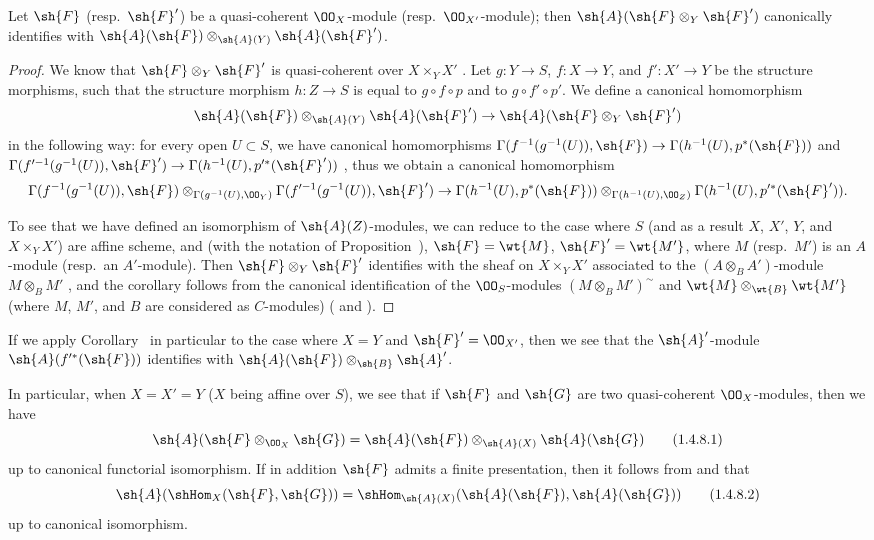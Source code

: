 \begin{cor}[1.4.7]
\label{2.1.4.7}
Let $\sh{F}$ (resp.~$\sh{F}'$) be a quasi-coherent $\OO_X$-module (resp.~$\OO_{X'}$-module); then $\sh{A}(\sh{F}\otimes_Y\sh{F}')$ canonically identifies with $\sh{A}(\sh{F})\otimes_{\sh{A}(Y)}\sh{A}(\sh{F}')$.
\end{cor}

\begin{proof}
\label{proof-2.1.4.7}
We know that $\sh{F}\otimes_Y\sh{F}'$ is quasi-coherent over $X\times_Y X'$ .
Let $g:Y\to S$, $f:X\to Y$, and $f':X'\to Y$ be the structure morphisms, such that the structure morphism
$h:Z\to S$ is equal to $g\circ f\circ p$ and to $g\circ f'\circ p'$.
We define a canonical homomorphism
\[
  \sh{A}(\sh{F})\otimes_{\sh{A}(Y)}\sh{A}(\sh{F}')\to\sh{A}(\sh{F}\otimes_Y\sh{F}')
\]
in the following way: for every open $U\subset S$, we have canonical homomorphisms $\Gamma(f^{-1}(g^{-1}(U)),\sh{F})\to\Gamma(h^{-1}(U),p^*(\sh{F}))$ and $\Gamma(f^{\prime-1}(g^{-1}(U)),\sh{F}')\to\Gamma(h^{-1}(U),p^{\prime*}(\sh{F}'))$ , thus we obtain a canonical homomorphism
\[
  \Gamma(f^{-1}(g^{-1}(U)),\sh{F})\otimes_{\Gamma(g^{-1}(U),\OO_Y)}\Gamma(f^{\prime-1}(g^{-1}(U)),\sh{F}')\to\Gamma(h^{-1}(U),p^*(\sh{F}))\otimes_{\Gamma(h^{-1}(U),\OO_Z)}\Gamma(h^{-1}(U),p^{\prime*}(\sh{F}')).
\]

To see that we have defined an isomorphism of $\sh{A}(Z)$-modules, we can reduce to the case where $S$ (and as a result $X$, $X'$, $Y$, and $X\times_Y X'$) are affine scheme, and (with the notation of Proposition~), $\sh{F}=\wt{M}$, $\sh{F}'=\wt{M'}$, where $M$ (resp.~$M'$) is an $A$-module (resp.~an $A'$-module).
Then $\sh{F}\otimes_Y\sh{F}'$ identifies with the sheaf on $X\times_Y X'$ associated to the $(A\otimes_B A')$-module $M\otimes_B M'$ , and the corollary follows from the canonical identification of the $\OO_S$-modules $(M\otimes_B M')^\sim$ and $\wt{M}\otimes_\wt{B}\wt{M'}$ (where $M$, $M'$, and $B$ are considered as $C$-modules) ( and ).
\end{proof}

If we apply Corollary~ in particular to the case where $X=Y$ and $\sh{F}'=\OO_{X'}$, then we see that the $\sh{A}'$-module $\sh{A}(f^{\prime*}(\sh{F}))$ identifies with $\sh{A}(\sh{F})\otimes_\sh{B}\sh{A}'$.

\begin{env}[1.4.8]
\label{2.1.4.8}
In particular, when $X=X'=Y$ ($X$ being affine over $S$), we see that if $\sh{F}$ and $\sh{G}$ are two quasi-coherent $\OO_X$-modules, then we have
\[
\label{2.1.4.8.1}
  \sh{A}(\sh{F}\otimes_{\OO_X}\sh{G})=\sh{A}(\sh{F})\otimes_{\sh{A}(X)}\sh{A}(\sh{G})
  \tag{1.4.8.1}
\]
up to canonical functorial isomorphism.
If in addition $\sh{F}$ admits a finite presentation, then it follows from  and  that
\[
\label{2.1.4.8.2}
  \sh{A}(\shHom_X(\sh{F},\sh{G}))=\shHom_{\sh{A}(X)}(\sh{A}(\sh{F}),\sh{A}(\sh{G}))
  \tag{1.4.8.2}
\]
up to canonical isomorphism.
\end{env}

